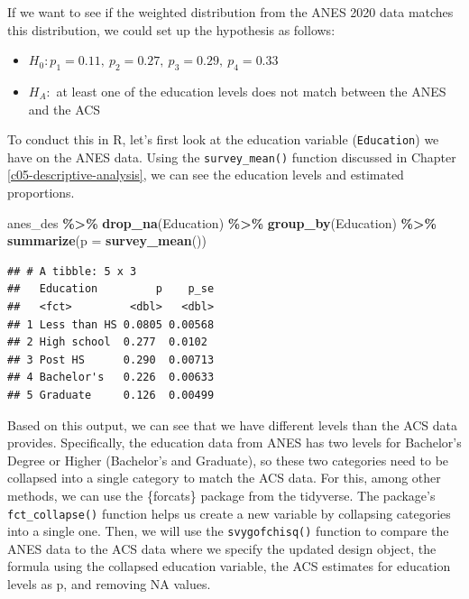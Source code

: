 \documentclass[
]{krantz}
\makeatletter
\newenvironment{Shaded}{\begin{snugshade}}{\end{snugshade}}
\newcommand{\AttributeTok}[1]{\textcolor[rgb]{0.27,0.27,0.27}{#1}}
\newcommand{\FunctionTok}[1]{\textcolor[rgb]{0.27,0.27,0.27}{\textbf{#1}}}
\newcommand{\NormalTok}[1]{#1}
\newcommand{\SpecialCharTok}[1]{\textcolor[rgb]{0.43,0.43,0.43}{\textbf{#1}}}
\providecommand{\tightlist}{%
  \setlength{\itemsep}{0pt}\setlength{\parskip}{0pt}}
\newenvironment{kframe}{%
\medskip{}
\setlength{\fboxsep}{.8em}
 \def\at@end@of@kframe{}%
 \ifinner\ifhmode%
  \def\at@end@of@kframe{\end{minipage}}%
  \begin{minipage}{\columnwidth}%
 \fi\fi%
 \def\FrameCommand##1{\hskip\@totalleftmargin \hskip-\fboxsep
 \colorbox{shadecolor}{##1}\hskip-\fboxsep
     \hskip-\linewidth \hskip-\@totalleftmargin \hskip\columnwidth}%
 \MakeFramed {\advance\hsize-\width
   \@totalleftmargin\z@ \linewidth\hsize
   \@setminipage}}%
 {\par\unskip\endMakeFramed%
 \at@end@of@kframe}
\renewenvironment{Shaded}{\begin{kframe}}{\end{kframe}}
\makeatother
\begin{document}
If we want to see if the weighted distribution from the ANES 2020 data matches this distribution, we could set up the hypothesis as follows:

\begin{itemize}
\tightlist
\item
  \(H_0: p_1 = 0.11, ~ p_2 = 0.27, ~ p_3 = 0.29, ~ p_4 = 0.33\)
\item
  \(H_A:\) at least one of the education levels does not match between the ANES and the ACS
\end{itemize}

To conduct this in R, let's first look at the education variable (\texttt{Education}) we have on the ANES data. Using the \texttt{survey\_mean()} function discussed in Chapter \ref{c05-descriptive-analysis}, we can see the education levels and estimated proportions.

\begin{Shaded}
\begin{Highlighting}[]
\NormalTok{anes\_des }\SpecialCharTok{\%\textgreater{}\%}
  \FunctionTok{drop\_na}\NormalTok{(Education) }\SpecialCharTok{\%\textgreater{}\%}
  \FunctionTok{group\_by}\NormalTok{(Education) }\SpecialCharTok{\%\textgreater{}\%}
  \FunctionTok{summarize}\NormalTok{(}\AttributeTok{p =} \FunctionTok{survey\_mean}\NormalTok{())}
\end{Highlighting}
\end{Shaded}

\begin{verbatim}
## # A tibble: 5 x 3
##   Education         p    p_se
##   <fct>         <dbl>   <dbl>
## 1 Less than HS 0.0805 0.00568
## 2 High school  0.277  0.0102 
## 3 Post HS      0.290  0.00713
## 4 Bachelor's   0.226  0.00633
## 5 Graduate     0.126  0.00499
\end{verbatim}

Based on this output, we can see that we have different levels than the ACS data provides. Specifically, the education data from ANES has two levels for Bachelor's Degree or Higher (Bachelor's and Graduate), so these two categories need to be collapsed into a single category to match the ACS data. For this, among other methods, we can use the \{forcats\} package from the tidyverse. The package's \texttt{fct\_collapse()} function helps us create a new variable by collapsing categories into a single one. Then, we will use the \texttt{svygofchisq()} function to compare the ANES data to the ACS data where we specify the updated design object, the formula using the collapsed education variable, the ACS estimates for education levels as p, and removing NA values.
\end{document}
